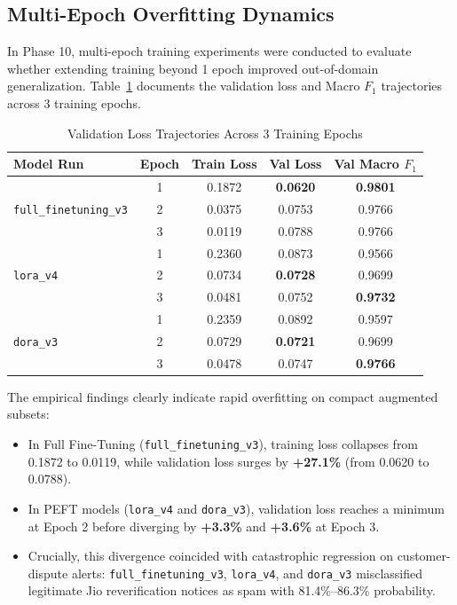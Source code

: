 \documentclass[conference]{IEEEtran}
\begin{document}
\subsection{Multi-Epoch Overfitting Dynamics}
In Phase 10, multi-epoch training experiments were conducted to evaluate whether extending training beyond 1 epoch improved out-of-domain generalization. Table~\ref{tab:epoch_histories} documents the validation loss and Macro $F_1$ trajectories across 3 training epochs.

\begin{table}[t]
\caption{Validation Loss Trajectories Across 3 Training Epochs}
\label{tab:epoch_histories}
\centering
\begin{tabularx}{\columnwidth}{lcccc}
\toprule
\textbf{Model Run} & \textbf{Epoch} & \textbf{Train Loss} & \textbf{Val Loss} & \textbf{Val Macro $F_1$} \\
\midrule
\multirow{3}{*}{\texttt{full\_finetuning\_v3}} & 1 & 0.1872 & \textbf{0.0620} & \textbf{0.9801} \\
 & 2 & 0.0375 & 0.0753 & 0.9766 \\
 & 3 & 0.0119 & 0.0788 & 0.9766 \\
\midrule
\multirow{3}{*}{\texttt{lora\_v4}} & 1 & 0.2360 & 0.0873 & 0.9566 \\
 & 2 & 0.0734 & \textbf{0.0728} & 0.9699 \\
 & 3 & 0.0481 & 0.0752 & \textbf{0.9732} \\
\midrule
\multirow{3}{*}{\texttt{dora\_v3}} & 1 & 0.2359 & 0.0892 & 0.9597 \\
 & 2 & 0.0729 & \textbf{0.0721} & 0.9699 \\
 & 3 & 0.0478 & 0.0747 & \textbf{0.9766} \\
\bottomrule
\end{tabularx}
\end{table}

The empirical findings clearly indicate rapid overfitting on compact augmented subsets:
\begin{itemize}
    \item In Full Fine-Tuning (\texttt{full\_finetuning\_v3}), training loss collapses from 0.1872 to 0.0119, while validation loss surges by \textbf{+27.1\%} (from 0.0620 to 0.0788).
    \item In PEFT models (\texttt{lora\_v4} and \texttt{dora\_v3}), validation loss reaches a minimum at Epoch 2 before diverging by \textbf{+3.3\%} and \textbf{+3.6\%} at Epoch 3.
    \item Crucially, this divergence coincided with catastrophic regression on customer-dispute alerts: \texttt{full\_finetuning\_v3}, \texttt{lora\_v4}, and \texttt{dora\_v3} misclassified legitimate Jio reverification notices as spam with 81.4\%--86.3\% probability.
\end{itemize}
\end{document}
